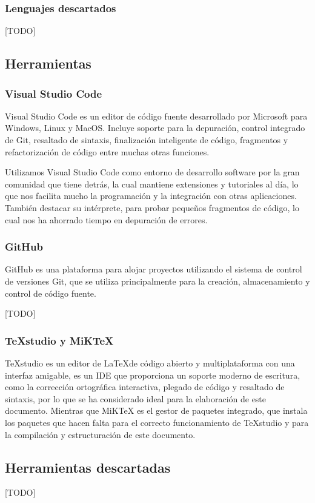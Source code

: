 \subsubsection{Lenguajes descartados} 

[TODO]

\subsection{Herramientas} 

\subsubsection*{Visual Studio Code}
Visual Studio Code es un editor de código fuente desarrollado por Microsoft para Windows, Linux y MacOS. Incluye soporte para la depuración, control integrado de Git, resaltado de sintaxis, finalización inteligente de código, fragmentos y refactorización de código entre muchas otras funciones. 

Utilizamos Visual Studio Code como entorno de desarrollo software por la gran comunidad que tiene detrás, la cual mantiene extensiones y tutoriales al día, lo que nos facilita mucho la programación y la integración con otras aplicaciones. También destacar su intérprete, para probar pequeños fragmentos de código, lo cual nos ha ahorrado tiempo en depuración de errores.

\subsubsection*{GitHub}
GitHub es una plataforma para alojar proyectos utilizando el sistema de control de versiones Git, que se utiliza principalmente para la creación, almacenamiento y control de código fuente.  

[TODO]

\subsubsection*{TeXstudio y MiKTeX}
TeXstudio es un editor de \LaTeX\space de código abierto y multiplataforma con una interfaz amigable, es un IDE que proporciona un soporte moderno de escritura, como la corrección ortográfica interactiva, plegado de código y resaltado de sintaxis, por lo que se ha considerado ideal para la elaboración de este documento.
Mientras que MiKTeX es el gestor de paquetes integrado, que instala los paquetes que hacen falta para el correcto funcionamiento de TeXstudio y para la compilación y estructuración de este documento.

\subsection{Herramientas descartadas} 

[TODO]

